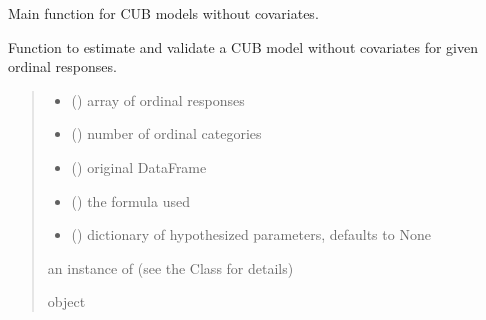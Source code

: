 \documentclass[letterpaper,10pt,english]{sphinxmanual}
\begin{document}

\begin{fulllineitems}
\label{\detokenize{cubmods:cubmods.ihg.mle}}
\pysigstartsignatures
{}
\pysigstopsignatures
\sphinxAtStartPar
Main function for CUB models without covariates.

\sphinxAtStartPar
Function to estimate and validate a CUB model without covariates for given ordinal responses.
\begin{quote}\begin{description}
\begin{itemize}
\item {} 
\sphinxAtStartPar
{} () \textendash{} array of ordinal responses

\item {} 
\sphinxAtStartPar
{} () \textendash{} number of ordinal categories

\item {} 
\sphinxAtStartPar
{} () \textendash{} original DataFrame

\item {} 
\sphinxAtStartPar
{} () \textendash{} the formula used

\item {} 
\sphinxAtStartPar
{} (\sphinxstyleliteralemphasis{\sphinxupquote{, }}) \textendash{} dictionary of hypothesized parameters, defaults to None

\end{itemize}

\sphinxAtStartPar
an instance of  (see the Class for details)

\sphinxAtStartPar
object

\end{description}\end{quote}

\end{fulllineitems}
\end{document}
